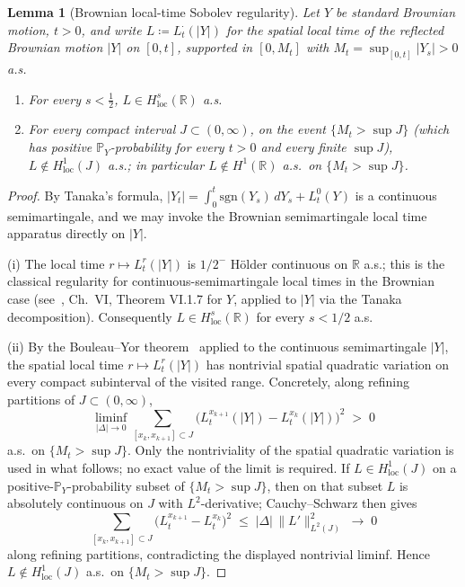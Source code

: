 \documentclass[11pt,reqno]{amsart}
\theoremstyle{plain}
\newtheorem{lemma}[theorem]{Lemma}
\theoremstyle{definition}
\theoremstyle{remark}
\newcommand{\R}{\mathbb{R}}
\newcommand{\Prob}{\mathbb{P}}
\begin{document}
\begin{lemma}[Brownian local-time Sobolev regularity]\label{lem:lt-sobolev}
Let $Y$ be standard Brownian motion, $t>0$, and write
$L\coloneqq L_t^{\cdot}(|Y|)$ for the spatial local time of the
reflected Brownian motion $|Y|$ on $[0,t]$, supported in $[0,M_t]$
with $M_t=\sup_{[0,t]}|Y_s|>0$ a.s.
\begin{enumerate}
\item For every $s<\tfrac12$, $L\in H^{s}_{\mathrm{loc}}(\R)$ a.s.
\item For every compact interval $J\subset(0,\infty)$, on the event
  $\{M_t>\sup J\}$ (which has positive $\Prob_Y$-probability for
  every $t>0$ and every finite $\sup J$),
  $L\notin H^{1}_{\mathrm{loc}}(J)$ a.s.; in particular
  $L\notin H^{1}(\R)$ a.s.\ on $\{M_t>\sup J\}$.
\end{enumerate}
\end{lemma}

\begin{proof}
By Tanaka's formula,
$|Y_t|=\int_0^{t}\mathrm{sgn}(Y_s)\,dY_s+L_t^{0}(Y)$ is a continuous
semimartingale, and we may invoke the Brownian semimartingale local
time apparatus directly on $|Y|$.

(i) The local time $r\mapsto L_t^{r}(|Y|)$ is $1/2^{-}$ H\"older
continuous on $\R$ a.s.; this is the classical regularity for
continuous-semimartingale local times in the Brownian case
(see~\cite{RevuzYor}, Ch.~VI, Theorem VI.1.7 for $Y$, applied to
$|Y|$ via the Tanaka decomposition). Consequently
$L\in H^{s}_{\mathrm{loc}}(\R)$ for every $s<1/2$ a.s.

(ii) By the Bouleau--Yor theorem~\cite{BouleauYor} applied to the
continuous semimartingale $|Y|$, the spatial local time
$r\mapsto L_t^{r}(|Y|)$ has nontrivial spatial quadratic variation
on every compact subinterval of the visited range. Concretely,
along refining partitions of $J\subset(0,\infty)$,
\[
  \liminf_{|\Delta|\to 0}\sum_{[x_k,x_{k+1}]\subset J}
   \bigl(L_t^{x_{k+1}}(|Y|)-L_t^{x_k}(|Y|)\bigr)^{2}\;>\;0
\]
a.s.\ on $\{M_t>\sup J\}$. Only the nontriviality of the spatial
quadratic variation is used in what follows; no exact value of the
limit is required. If $L\in H^{1}_{\mathrm{loc}}(J)$ on a
positive-$\Prob_Y$-probability subset of $\{M_t>\sup J\}$, then on
that subset $L$ is absolutely continuous on $J$ with
$L^{2}$-derivative; Cauchy--Schwarz then gives
\[
  \sum_{[x_k,x_{k+1}]\subset J}\bigl(L_t^{x_{k+1}}-L_t^{x_k}\bigr)^{2}
   \;\le\;|\Delta|\,\|L'\|_{L^{2}(J)}^{2}\;\to\;0
\]
along refining partitions, contradicting the displayed nontrivial
liminf. Hence $L\notin H^{1}_{\mathrm{loc}}(J)$ a.s.\ on
$\{M_t>\sup J\}$.
\end{proof}
\end{document}
